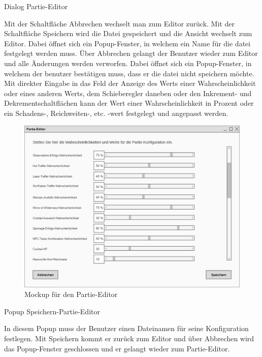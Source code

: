 Dialog \glqq{}Partie-Editor\grqq{}

Mit der Schaltfläche \glqq{}Abbrechen\grqq{} wechselt man zum Editor zurück. Mit der Schaltfläche \glqq{}Speichern\grqq{} wird die Datei gespeichert und die Ansicht wechselt zum Editor. Dabei öffnet sich ein Popup-Fenster, in welchem ein Name für die datei festgelegt werden muss. Über Abbrechen gelangt der Benutzer wieder zum Editor und alle Änderungen werden verworfen. Dabei öffnet sich ein Popup-Fenster, in welchem der benutzer bestätigen muss, dass er die datei nicht speichern möchte. Mit direkter Eingabe in das Feld der Anzeige des Werts einer Wahrscheinlichkeit oder eines anderen Werts, dem Schieberegler daneben oder den Inkrement- und Dekrementschaltflächen kann der Wert einer Wahrscheinlichkeit in Prozent oder ein Schadens-, Reichweiten-, etc. -wert festgelegt und angepasst werden.

\begin{figure}
  \centering
  \includegraphics[width=\textwidth]{Meilenstein03/Partie-Editor_Mockup.png}
  \caption{Mockup für den Partie-Editor}
\end{figure}

Popup \glqq{}Speichern-Partie-Editor\grqq{}

In diesem Popup muss der Benutzer einen Dateinamen für seine Konfiguration festlegen. Mit Speichern kommt er zurück zum Editor und über Abbrechen wird das Popup-Fenster geschlossen und er gelangt wieder zum Partie-Editor.

